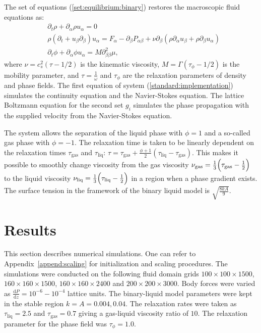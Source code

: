 \documentclass[preprint,12pt]{elsarticle}
\begin{document}
The set of equations (\ref{set:equilibrium:binary}) restores the macroscopic
fluid equations as:
\begin{equation}
\label{full:navier:stokes}
\begin{aligned}
&\partial_t \rho+ \partial_{\alpha} \rho u_{\alpha}=0\\
&\rho\left(\partial_t+u_{\beta}\partial_{\beta}\right) u_{\alpha}=F_{\alpha}
-\partial_{\beta}P_{\alpha \beta} +
\nu\partial_{\beta}\left(\rho\partial_{\alpha}u_{\beta}+\rho\partial_{\beta} u_{\alpha}\right)\\
&\partial_t \phi + \partial_{\alpha} \phi u_{\alpha}=M \partial^2_{\beta\beta} \mu,
\end{aligned}
\end{equation}
where $\nu=c_s^2 (\tau-1/2)$ is the kinematic viscosity,
$M=\Gamma(\tau_{\phi}-1/2)$ is the mobility parameter, and $\tau=\frac{1}{\omega}$ and $\tau_{\phi}$
are the relaxation parameters of density and phase fields. The first equation of system
(\ref{standard:implementation}) simulates the continuity equation and the Navier-Stokes equation.
The lattice Boltzmann equation for the second set $g_i$ simulates the phase propagation with the
supplied velocity from the Navier-Stokes equation.

The system allows the separation of the liquid
phase with $\phi=1$ and a so-called gas phase with $\phi=-1$. The
relaxation time is taken to be linearly dependent on the relaxation
times $\tau_{\mathrm{gas}}$ and $\tau_{\mathrm{liq}}$:
$\tau=\tau_{\mathrm{gas}}+\frac{\phi+1}{2}(\tau_{\mathrm{liq}}-\tau_{\mathrm{gas}})$. This
makes it possible to smoothly change viscosity from the gas viscosity
$\nu_{\mathrm{gas}}=\frac{1}{3}\Bigl(\tau_{\mathrm{gas}}-\frac{1}{2}\Bigr)$ to the liquid viscosity
$\nu_{\mathrm{liq}}=\frac{1}{3}\Bigl(\tau_{\mathrm{liq}}-\frac{1}{2}\Bigr)$ in a region when a
phase gradient exists. The surface tension in the framework of the binary liquid model is $\sqrt{\frac{8 k
A}{9}}$.

\section{Results}
\label{sec:results}
This section describes numerical simulations. One can refer to Appendix~\ref{append:scaling} for
initialization and scaling procedures. The simulations were conducted on the following 
fluid domain grids $100 \times 100 \times 1500$, $160 \times 160 \times 1500$,
$160 \times 160 \times 2400$ and $200 \times 200 \times 3000$. Body forces were varied as
$\frac{\mathrm{d}P}{\mathrm{d}z}=10^{-6}-10^{-4}$ lattice units. The binary-liquid model parameters
were kept in
the stable region $k=A=0.004,0.04$. The relaxation rates were taken as $\tau_{\mathrm{liq}}=2.5$
and $\tau_{\mathrm{gas}}=0.7$ giving a gas-liquid viscosity ratio of $10$. The relaxation
parameter for the phase field was $\tau_{\phi}=1.0$.
\end{document}
